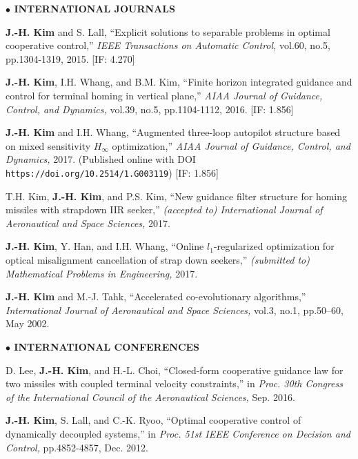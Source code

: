 \documentclass[margin,line]{res}
\begin{document}
\begin{resume}
%
%

{\bf $\bullet$ {INTERNATIONAL JOURNALS}}

{\bf J.-H. Kim} and S. Lall, ``Explicit solutions to separable problems in optimal cooperative control,'' \emph{IEEE Transactions on Automatic Control,} vol.60, no.5, pp.1304-1319, 2015. [IF: 4.270]

{\bf J.-H. Kim}, I.H. Whang, and B.M. Kim, ``Finite horizon integrated guidance and control for terminal homing in vertical plane,'' \emph{AIAA Journal of Guidance, Control, and Dynamics,} vol.39, no.5, pp.1104-1112, 2016. [IF: 1.856]

{\bf J.-H. Kim} and I.H. Whang, ``Augmented three-loop autopilot structure based on mixed sensitivity $H_\infty$ optimization,'' \emph{AIAA Journal of Guidance, Control, and Dynamics,} 2017. (Published online with DOI \texttt{https://doi.org/10.2514/1.G003119}) [IF: 1.856]

T.H. Kim, {\bf J.-H. Kim}, and P.S. Kim, ``New guidance filter structure for homing missiles with strapdown IIR seeker,'' \emph{(accepted to) International Journal of Aeronautical and Space Sciences,} 2017. 

{\bf J.-H. Kim}, Y. Han, and I.H. Whang, ``Online $l_1$-regularized optimization for optical misalignment cancellation of strap down seekers,'' \emph{(submitted to) Mathematical Problems in Engineering,} 2017. 

{\bf J.-H. Kim} and M.-J. Tahk, ``Accelerated co-evolutionary algorithms,'' \emph{International Journal of Aeronautical and Space Sciences,} vol.3, no.1, pp.50--60, May 2002.

{\bf $\bullet$ INTERNATIONAL CONFERENCES}

D. Lee, {\bf J.-H. Kim}, and H.-L. Choi, ``Closed-form cooperative guidance law for two missiles with coupled terminal velocity constraints,'' in \emph{Proc. 30th Congress of the International Council of the Aeronautical Sciences,} Sep. 2016.

{\bf J.-H. Kim}, S. Lall, and C.-K. Ryoo, ``Optimal cooperative control of dynamically decoupled systems,'' in \emph{Proc. 51st IEEE Conference on Decision and Control,} pp.4852-4857, Dec. 2012.


\end{resume}
\end{document}
